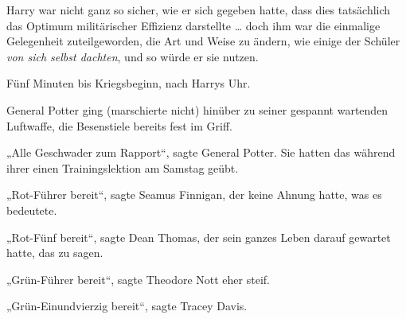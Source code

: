 Harry war nicht ganz so sicher, wie er sich gegeben hatte, dass dies tatsächlich das Optimum militärischer Effizienz darstellte … doch ihm war die einmalige Gelegenheit zuteilgeworden, die Art und Weise zu ändern, wie einige der Schüler \emph{von sich selbst dachten}, und so würde er sie nutzen.

Fünf Minuten bis Kriegsbeginn, nach Harrys Uhr.

General Potter ging (marschierte nicht) hinüber zu seiner gespannt wartenden Luftwaffe, die Besenstiele bereits fest im Griff.

„Alle Geschwader zum Rapport“, sagte General Potter. Sie hatten das während ihrer einen Trainingslektion am Samstag geübt.

„Rot-Führer bereit“, sagte Seamus Finnigan, der keine Ahnung hatte, was es bedeutete.

„Rot-Fünf bereit“, sagte Dean Thomas, der sein ganzes Leben darauf gewartet hatte, das zu sagen.

„Grün-Führer bereit“, sagte Theodore Nott eher steif.

„Grün-Einundvierzig bereit“, sagte Tracey Davis.

